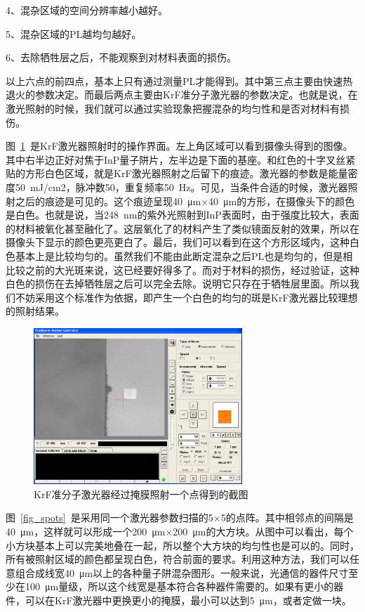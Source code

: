 \documentclass{ZJUthesis}
\begin{document}
4、混杂区域的空间分辨率越小越好。

5、混杂区域的PL越均匀越好。

6、去除牺牲层之后，不能观察到对材料表面的损伤。

以上六点的前四点，基本上只有通过测量PL才能得到。其中第三点主要由快速热退火的参数决定。而最后两点主要由KrF准分子激光器的参数决定。也就是说，在激光照射的时候，我们就可以通过实验现象把握混杂的均匀性和是否对材料有损伤。

图~\ref{fig_spot}~是KrF激光器照射时的操作界面。左上角区域可以看到摄像头得到的图像。其中右半边正好对焦于InP量子阱片，左半边是下面的基座。和红色的十字叉丝紧贴的方形白色区域，就是KrF激光器照射之后留下的痕迹。激光器的参数是能量密度50~mJ/cm2，脉冲数50，重复频率50~Hz。可见，当条件合适的时候，激光器照射之后的痕迹是可见的。这个痕迹呈现40~μm$\times$40~μm的方形，在摄像头下的颜色是白色。也就是说，当248~nm的紫外光照射到InP表面时，由于强度比较大，表面的材料被氧化甚至融化了。这层氧化了的材料产生了类似镜面反射的效果，所以在摄像头下显示的颜色更亮更白了。最后，我们可以看到在这个方形区域内，这种白色基本上是比较均匀的。虽然我们不能由此断定混杂之后PL也是均匀的，但是相比较之前的大光斑来说，这已经要好得多了。而对于材料的损伤，经过验证，这种白色的损伤在去掉牺牲层之后可以完全去除。说明它只存在于牺牲层里面。所以我们不妨采用这个标准作为依据，即产生一个白色的均匀的斑是KrF激光器比较理想的照射结果。

\begin{figure}[htbp]
    \centering
    \includegraphics[width=0.7\textwidth]{./Pictures/spot.eps}
    \caption{KrF准分子激光器经过掩膜照射一个点得到的截图}
    \label{fig_spot}
\end{figure}

图~\ref{fig_spots}~是采用同一个激光器参数扫描的5$\times$5的点阵。其中相邻点的间隔是40~μm，这样就可以形成一个200~μm$\times$200~μm的大方块。从图中可以看出，每个小方块基本上可以完美地叠在一起，所以整个大方块的均匀性也是可以的。同时，所有被照射区域的颜色都呈现白色，符合前面的要求。利用这种方法，我们可以任意组合成线宽40~μm以上的各种量子阱混杂图形。一般来说，光通信的器件尺寸至少在100~μm量级，所以这个线宽是基本符合各种器件需要的。如果有更小的器件，可以在KrF激光器中更换更小的掩膜，最小可以达到5~μm，或者定做一块。
\end{document}
